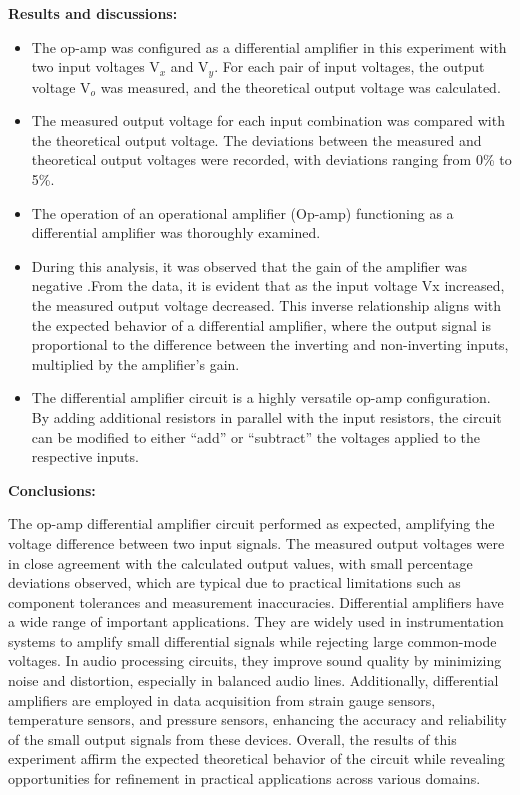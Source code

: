 \documentclass[11pt]{scrreprt}
\begin{document}
\noindent\textbf{ Results and discussions:}
\begin{itemize}
 \item The op-amp was configured as a differential amplifier in this experiment with two input voltages V$_x$  and V$_y$. For each pair of input voltages, the output voltage V$_o$ was measured, and the theoretical output voltage was calculated.
\item The measured output voltage for each input combination was compared with the theoretical output voltage. The deviations between the measured and theoretical output voltages were recorded, with deviations ranging from 0\% to 5\%.
\item The operation of an operational amplifier (Op-amp) functioning as a differential amplifier was thoroughly examined.
\item During this analysis, it was observed that the gain of the amplifier was negative .From the data, it is evident that as the input voltage Vx increased, the measured output voltage decreased. This inverse relationship aligns with the expected behavior of a differential amplifier, where the output signal is proportional to the difference between the inverting and non-inverting inputs, multiplied by the amplifier’s gain.
\item The differential amplifier circuit is a highly versatile op-amp configuration. By adding additional resistors in parallel with the input resistors, the circuit can be modified to either “add” or “subtract” the voltages applied to the respective inputs.
\end{itemize}

\newpage
\noindent\textbf{Conclusions:}
\par The op-amp differential amplifier circuit performed as expected, amplifying the voltage difference between two input signals. The measured output voltages were in close agreement with the calculated output values, with small percentage deviations observed, which are typical due to practical limitations such as component tolerances and measurement inaccuracies.
Differential amplifiers have a wide range of important applications. They are widely used in instrumentation systems to amplify small differential signals while rejecting large common-mode voltages. In audio processing circuits, they improve sound quality by minimizing noise and distortion, especially in balanced audio lines. Additionally, differential amplifiers are employed in data acquisition from strain gauge sensors, temperature sensors, and pressure sensors, enhancing the accuracy and reliability of the small output signals from these devices. Overall, the results of this experiment affirm the expected theoretical behavior of the circuit while revealing opportunities for refinement in practical applications across various domains.
\end{document}
